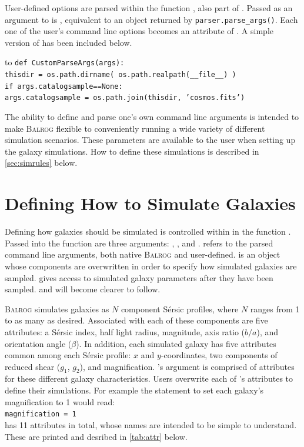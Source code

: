 \documentclass[12pt]{book}
\newcommand{\balrog}{\textsc{Balrog}}
\newcommand{\inline}{\\[0.4cm]}
\newcommand{\sersic}{S\'{e}rsic}
\begin{document}
User-defined options are parsed within the function \parsefunc{},
also part of \config{}.
Passed as an argument to \parsefunc{} is \parseargs{}, equivalent
to an object returned by \texttt{parser.parse\_args()}. Each one of the user's 
command line options becomes an attribute of \parseargs{}. 
A simple version of \parsefunc{} has been included below.

\setlength{\tabcolsep}{0pt}
\begin{longtabu*} to \linewidth {X}
\texttt{def CustomParseArgs(args):}\\
\hspace{20pt} \texttt{thisdir = os.path.dirname( os.path.realpath(\_\_file\_\_) )} \\
\hspace{20pt} \texttt{if args.catalogsample==None:} \\
\hspace{40pt} \texttt{args.catalogsample = os.path.join(thisdir, 'cosmos.fits')}
\end{longtabu*}
\setlength{\tabcolsep}{6pt}
\addtocounter{table}{-1}

\noindent The ability to define and parse one's own command line arguments is intended to make
\balrog{} flexible to conveniently running a wide variety of different
simulation scenarios. These parameters are available to the user 
when setting up the galaxy simulations. How to define these simulations is described in
\autoref{sec:simrules} below.

\chapter{Defining How to Simulate Galaxies}
\label{sec:simrules}

Defining how galaxies should be simulated is controlled within \config{}
in the function \simfunc{}. Passed into the function are three
arguments: \simargs{}, \simrules{}, and \simsamp{}.
\simargs{} refers to the parsed command line arguments,
both native \balrog{} and user-defined.
\simrules{} is an object whose components are overwritten
in order to specify how simulated galaxies are sampled.
\simsamp{} gives access to simulated galaxy parameters
after they have been sampled. \simrules{} and \simsamp{}
will become clearer to follow.

\balrog{} simulates galaxies as $N$ component \sersic{} profiles, 
where $N$ ranges from 1 to as many as desired. Associated
with each of these components are five attributes: a \sersic{} index,
half light radius, magnitude, axis ratio ($b/a$), and orientation
angle ($\beta$). In addition, each simulated galaxy has five attributes
common among each \sersic{} profile: $x$ and $y$-coordinates,
two components of reduced shear ($g_1$, $g_2$), and magnification.
\simfunc{}'s argument \simrules{} is comprised of attributes
for these different galaxy characteristics. Users overwrite
each of \simrules{}'s attributes to define their simulations.
For example the statement to set each galaxy's magnification
to 1 would read:
\inline
\texttt{magnification = 1}
\inline
\simrules{} has 11 attributes in total, whose names are intended to be simple to understand.
These are printed and desribed in \autoref{tab:attr} below.
\end{document}
